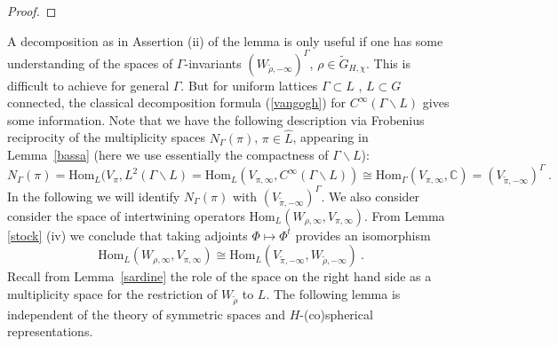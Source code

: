 \documentclass[10]{amsart}
\theoremstyle{remark}
\theoremstyle{definition}
\numberwithin{equation}{section}
\newcommand{\C}{\mathbb{C}}           %
\newcommand{\Hom}{\mathrm{Hom}}
\begin{document}
{\begin{proof}
\end{proof}
A decomposition as in Assertion (ii) of the lemma is only useful if one has some understanding of the spaces of $\Gamma$-invariants $(W_{\tilde \rho,-\infty})^\Gamma$, $\rho\in \widetilde G_{H,\chi}$. This is difficult to achieve for general $\Gamma$. But for uniform lattices $\Gamma\subset L$ , $L\subset G$ connected, the classical decomposition formula (\ref{vangogh})  for $C^\infty(\Gamma\backslash L)$ 
gives some information. 
Note that we have the following description via Frobenius reciprocity of the multiplicity spaces $N_\Gamma(\pi)$, $\pi\in\hat L$, appearing in Lemma~\ref{bassa} (here we use essentially the compactness of $\Gamma\backslash L$):
$$ N_\Gamma(\pi)=\Hom_L(V_\pi, L^2(\Gamma\backslash L)=\Hom_L(V_{\pi,\infty}, C^\infty(\Gamma\backslash L))\cong \Hom_\Gamma(V_{\pi,\infty}, \C)
=  (V_{\tilde \pi,-\infty})^\Gamma\ .
$$
In the following we will identify $N_\Gamma(\pi)$ with $ (V_{\tilde \pi,-\infty})^\Gamma$. We also consider consider the space of intertwining operators $\Hom_L(W_{\rho,\infty}, V_{\pi,\infty})$. From Lemma \ref{stock} (iv) we conclude
that taking adjoints $\Phi\mapsto \Phi^t$ provides an isomorphism
\begin{equation}\label{putzi}   \Hom_L(W_{\rho,\infty}, V_{\pi,\infty})\cong \Hom_L( V_{\tilde\pi,-\infty},W_{\tilde\rho,-\infty})\ .
\end{equation}
Recall from Lemma~\ref{sardine} the role of the space on the right hand side as a multiplicity space for the restriction of $W_{\tilde\rho}$ to $L$.
The following lemma is independent of the theory of symmetric spaces and $H$-(co)spherical representations.

}
\end{document}
